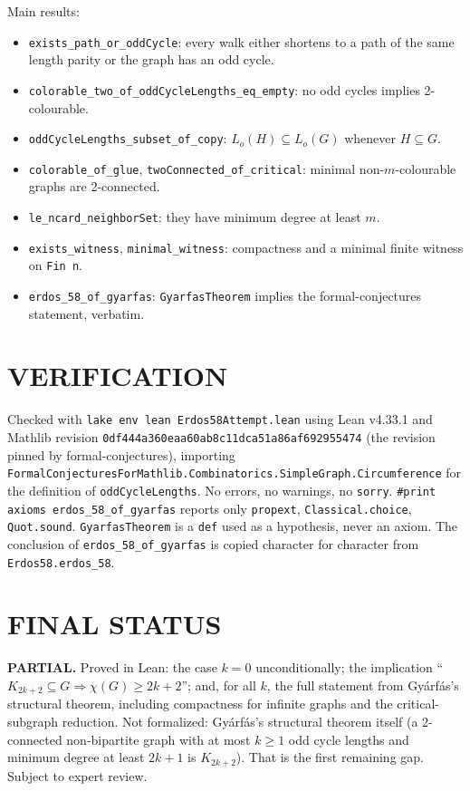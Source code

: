 Main results:
\begin{itemize}
\item \texttt{exists\_path\_or\_oddCycle}: every walk either shortens to a path of the same length parity or the graph has an odd cycle.
\item \texttt{colorable\_two\_of\_oddCycleLengths\_eq\_empty}: no odd cycles implies 2-colourable.
\item \texttt{oddCycleLengths\_subset\_of\_copy}: $L_o(H)\subseteq L_o(G)$ whenever $H\subseteq G$.
\item \texttt{colorable\_of\_glue}, \texttt{twoConnected\_of\_critical}: minimal non-$m$-colourable graphs are 2-connected.
\item \texttt{le\_ncard\_neighborSet}: they have minimum degree at least $m$.
\item \texttt{exists\_witness}, \texttt{minimal\_witness}: compactness and a minimal finite witness on \texttt{Fin n}.
\item \texttt{erdos\_58\_of\_gyarfas}: \texttt{GyarfasTheorem} implies the formal-conjectures statement, verbatim.
\end{itemize}

\section{VERIFICATION}
Checked with \texttt{lake env lean Erdos58Attempt.lean} using Lean v4.33.1 and Mathlib revision \texttt{0df444a360eaa60ab8c11dca51a86af692955474} (the revision pinned by formal-conjectures), importing \texttt{FormalConjecturesForMathlib.Combinatorics.SimpleGraph.Circumference} for the definition of \texttt{oddCycleLengths}. No errors, no warnings, no \texttt{sorry}. \texttt{\#print axioms erdos\_58\_of\_gyarfas} reports only \texttt{propext}, \texttt{Classical.choice}, \texttt{Quot.sound}. \texttt{GyarfasTheorem} is a \texttt{def} used as a hypothesis, never an axiom. The conclusion of \texttt{erdos\_58\_of\_gyarfas} is copied character for character from \texttt{Erdos58.erdos\_58}.

\section{FINAL STATUS}
\textbf{PARTIAL.} Proved in Lean: the case $k=0$ unconditionally; the implication ``$K_{2k+2}\subseteq G\Rightarrow\chi(G)\ge2k+2$''; and, for all $k$, the full statement from Gy\'arf\'as's structural theorem, including compactness for infinite graphs and the critical-subgraph reduction. Not formalized: Gy\'arf\'as's structural theorem itself (a 2-connected non-bipartite graph with at most $k\ge1$ odd cycle lengths and minimum degree at least $2k+1$ is $K_{2k+2}$). That is the first remaining gap. Subject to expert review.
